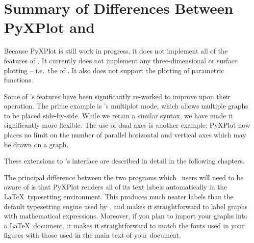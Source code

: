 %
%
%
%
%



\chapter{Summary of Differences Between PyXPlot and \gnuplot}
\label{ch:gnuplot_diffs}

Because PyXPlot is still work in progress, it does not implement all of the
features of \gnuplot. It currently does not implement any three-dimensional or
surface plotting -- i.e.\ the  of \gnuplot. It also does not
support the plotting of parametric functions.

Some of \gnuplot's features have been significantly re-worked to improve upon
their operation. The prime example is \gnuplot's multiplot mode, which allows
multiple graphs to be placed side-by-side. While we retain a similar syntax, we
have made it significantly more flexible. The use of dual axes is another
example: PyXPlot now places no limit on the number of parallel horizontal and
vertical axes which may be drawn on a graph.

These extensions to \gnuplot's interface are described in detail in the
following chapters.




The principal difference between the two programs which \gnuplot\ users will
need to be aware of is that PyXPlot renders all of its text labels
automatically in the \LaTeX\ typesetting environment. This produces much neater
labels than the default typesetting engine used by \gnuplot, and makes it
straightforward to label graphs with mathematical expressions. Moreover, if you
plan to import your graphs into a \LaTeX\ document, it makes it straightforward
to match the fonts used in your figures with those used in the main text of
your document.


